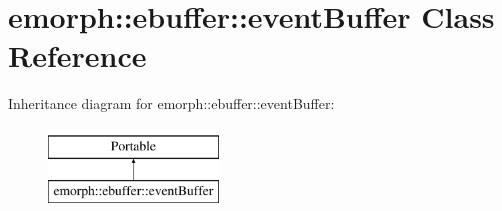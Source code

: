 \hypertarget{classemorph_1_1ebuffer_1_1eventBuffer}{\section{emorph\-:\-:ebuffer\-:\-:event\-Buffer Class Reference}
\label{classemorph_1_1ebuffer_1_1eventBuffer}
}
Inheritance diagram for emorph\-:\-:ebuffer\-:\-:event\-Buffer\-:\begin{figure}[H]
\begin{center}
\leavevmode
\includegraphics[height=2.000000cm]{classemorph_1_1ebuffer_1_1eventBuffer}
\end{center}
\end{figure}
